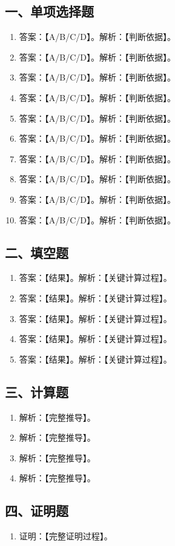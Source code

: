 \documentclass[UTF8,12pt,a4paper]{ctexart}
\begin{document}
\subsection*{一、单项选择题}
\begin{enumerate}
\item 答案：【A/B/C/D】。解析：【判断依据】。
\item 答案：【A/B/C/D】。解析：【判断依据】。
\item 答案：【A/B/C/D】。解析：【判断依据】。
\item 答案：【A/B/C/D】。解析：【判断依据】。
\item 答案：【A/B/C/D】。解析：【判断依据】。
\item 答案：【A/B/C/D】。解析：【判断依据】。
\item 答案：【A/B/C/D】。解析：【判断依据】。
\item 答案：【A/B/C/D】。解析：【判断依据】。
\item 答案：【A/B/C/D】。解析：【判断依据】。
\item 答案：【A/B/C/D】。解析：【判断依据】。
\end{enumerate}
\subsection*{二、填空题}
\begin{enumerate}
\item 答案：【结果】。解析：【关键计算过程】。
\item 答案：【结果】。解析：【关键计算过程】。
\item 答案：【结果】。解析：【关键计算过程】。
\item 答案：【结果】。解析：【关键计算过程】。
\item 答案：【结果】。解析：【关键计算过程】。
\end{enumerate}
\subsection*{三、计算题}
\begin{enumerate}
\item 解析：【完整推导】。
\item 解析：【完整推导】。
\item 解析：【完整推导】。
\item 解析：【完整推导】。
\end{enumerate}
\subsection*{四、证明题}
\begin{enumerate}
\item 证明：【完整证明过程】。
\end{enumerate}
\end{document}
